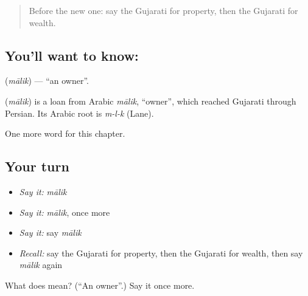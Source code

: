 \label{lesson:GU-C103-malik}



\begin{quote}
Before the new one: say the Gujarati for property, then the Gujarati for wealth.
\end{quote}

\subsection*{You'll want to know: }
\textbf{} (\emph{mālik}) — \textquotedblleft{}an owner\textquotedblright{}.

\begin{cousinweb}
\textbf{} (\emph{mālik}) is a loan from Arabic \emph{mālik}, \textquotedblleft{}owner\textquotedblright{}, which reached Gujarati through Persian. Its Arabic root is \emph{m-l-k} (Lane).
\end{cousinweb}

\begin{grammarlens}[title={What you've built}]
One more word for this chapter.
\end{grammarlens}

\subsection*{Your turn}
\begin{itemize}
\raggedright
  \item \emph{Say it:} \emph{mālik}
  \item \emph{Say it:} \emph{mālik}, once more
  \item \emph{Say it:} say \emph{mālik}
  \item \emph{Recall:} say the Gujarati for property, then the Gujarati for wealth, then say \emph{mālik} again
\end{itemize}

\begin{tcolorbox}[breakable,colback=teal!4,colframe=teal!35!black,title={Before you move on}]
What does  mean? (\textquotedblleft{}An owner\textquotedblright{}.) Say it once more.
\end{tcolorbox}
